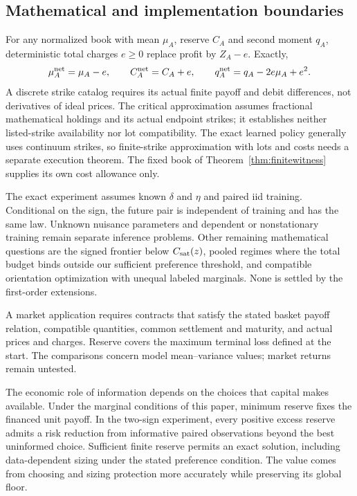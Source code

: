 \documentclass[11pt,a4paper]{amsart}
\theoremstyle{plain}
\theoremstyle{definition}
\theoremstyle{remark}
\begin{document}
\subsection{Mathematical and implementation boundaries}
For any normalized book with mean $\mu_A$, reserve $C_A$ and second moment $q_A$, deterministic total charges $e\ge0$ replace profit by $Z_A-e$. Exactly,
\[
 \mu_A^{\rm net}=\mu_A-e,\qquad C_A^{\rm net}=C_A+e,\qquad
 q_A^{\rm net}=q_A-2e\mu_A+e^2.
\]
A discrete strike catalog requires its actual finite payoff and debit differences, not derivatives of ideal prices. The critical approximation assumes fractional mathematical holdings and its actual endpoint strikes; it establishes neither listed-strike availability nor lot compatibility. The exact learned policy generally uses continuum strikes, so finite-strike approximation with lots and costs needs a separate execution theorem. The fixed book of Theorem~\ref{thm:finitewitness} supplies its own cost allowance only.

The exact experiment assumes known $\delta$ and $\eta$ and paired iid training. Conditional on the sign, the future pair is independent of training and has the same law. Unknown nuisance parameters and dependent or nonstationary training remain separate inference problems. Other remaining mathematical questions are the signed frontier below $C_{\rm sat}(z)$, pooled regimes where the total budget binds outside our sufficient preference threshold, and compatible orientation optimization with unequal labeled marginals. None is settled by the first-order extensions.

A market application requires contracts that satisfy the stated basket payoff relation, compatible quantities, common settlement and maturity, and actual prices and charges. Reserve covers the maximum terminal loss defined at the start. The comparisons concern model mean--variance values; market returns remain untested.

The economic role of information depends on the choices that capital makes available. Under the marginal conditions of this paper, minimum reserve fixes the financed unit payoff. In the two-sign experiment, every positive excess reserve admits a risk reduction from informative paired observations beyond the best uninformed choice. Sufficient finite reserve permits an exact solution, including data-dependent sizing under the stated preference condition. The value comes from choosing and sizing protection more accurately while preserving its global floor.
\end{document}
